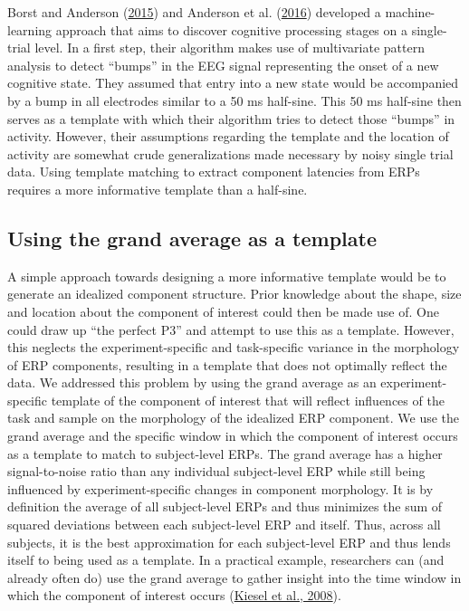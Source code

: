 \documentclass[
  man]{apa7}
\begin{document}
Borst and Anderson (\protect\hyperlink{ref-borst2015discovery}{2015}) and Anderson et al. (\protect\hyperlink{ref-anderson2016discovery}{2016}) developed a machine-learning approach that aims to discover cognitive processing stages on a single-trial level. In a first step, their algorithm makes use of multivariate pattern analysis to detect ``bumps'' in the EEG signal representing the onset of a new cognitive state. They assumed that entry into a new state would be accompanied by a bump in all electrodes similar to a 50 ms half-sine. This 50 ms half-sine then serves as a template with which their algorithm tries to detect those ``bumps'' in activity. However, their assumptions regarding the template and the location of activity are somewhat crude generalizations made necessary by noisy single trial data. Using template matching to extract component latencies from ERPs requires a more informative template than a half-sine.

\hypertarget{using-the-grand-average-as-a-template}{%
\subsection{Using the grand average as a template}\label{using-the-grand-average-as-a-template}}

A simple approach towards designing a more informative template would be to generate an idealized component structure. Prior knowledge about the shape, size and location about the component of interest could then be made use of. One could draw up ``the perfect P3'' and attempt to use this as a template. However, this neglects the experiment-specific and task-specific variance in the morphology of ERP components, resulting in a template that does not optimally reflect the data. We addressed this problem by using the grand average as an experiment-specific template of the component of interest that will reflect influences of the task and sample on the morphology of the idealized ERP component. We use the grand average and the specific window in which the component of interest occurs as a template to match to subject-level ERPs. The grand average has a higher signal-to-noise ratio than any individual subject-level ERP while still being influenced by experiment-specific changes in component morphology. It is by definition the average of all subject-level ERPs and thus minimizes the sum of squared deviations between each subject-level ERP and itself. Thus, across all subjects, it is the best approximation for each subject-level ERP and thus lends itself to being used as a template. In a practical example, researchers can (and already often do) use the grand average to gather insight into the time window in which the component of interest occurs (\protect\hyperlink{ref-kiesel2008measurement}{Kiesel et al., 2008}).
\end{document}
